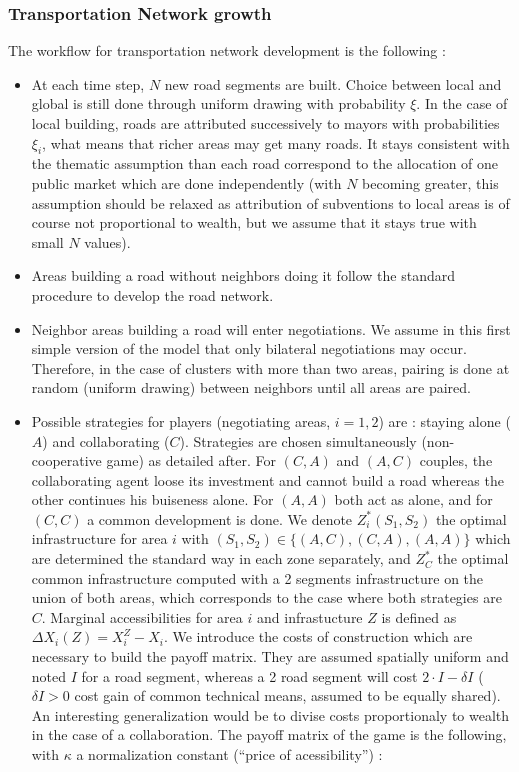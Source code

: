 \subsubsection{Transportation Network growth}


The workflow for transportation network development is the following :

\begin{itemize}

\item At each time step, $N$ new road segments are built. Choice between local and global is still done through uniform drawing with probability $\xi$. In the case of local building, roads are attributed successively to mayors with probabilities $\xi_i$, what means that richer areas may get many roads. It stays consistent with the thematic assumption than each road correspond to the allocation of one public market which are done independently (with $N$ becoming greater, this assumption should be relaxed as attribution of subventions to local areas is of course not proportional to wealth, but we assume that it stays true with small $N$ values). 

\item Areas building a road without neighbors doing it follow the standard procedure to develop the road network.

\item Neighbor areas building a road will enter negotiations. We assume in this first simple version of the model that only bilateral negotiations may occur. Therefore, in the case of clusters with more than two areas, pairing is done at random (uniform drawing) between neighbors until all areas are paired.

\item Possible strategies for players (negotiating areas, $i=1,2$) are : staying alone ($A$) and collaborating ($C$). Strategies are chosen simultaneously (non-cooperative game) as detailed after. For $(C,A)$ and $(A,C)$ couples, the collaborating agent loose its investment and cannot build a road whereas the other continues his buiseness alone. For $(A,A)$ both act as alone, and for $(C,C)$ a common development is done. We denote $Z^{\ast}_i(S_1,S_2)$ the optimal infrastructure for area $i$ with $(S_1,S_2)\in \{(A,C),(C,A),(A,A)\}$ which are determined the standard way in each zone separately, and $Z^{\ast}_C$ the optimal common infrastructure computed with a 2 segments infrastructure on the union of both areas, which corresponds to the case where both strategies are $C$. Marginal accessibilities for area $i$ and infrastucture $Z$ is defined as $\Delta X_i(Z)=X^Z_i - X_i$. We introduce the costs of construction which are necessary to build the payoff matrix. They are assumed spatially uniform and noted $I$ for a road segment, whereas a 2 road segment will cost $2\cdot I - \delta I$ ($\delta I > 0$ cost gain of common technical means, assumed to be equally shared). An interesting generalization would be to divise costs proportionaly to wealth in the case of a collaboration. The payoff matrix of the game is the following, with $\kappa$ a normalization constant (``price of acessibility'') :


\end{itemize}
